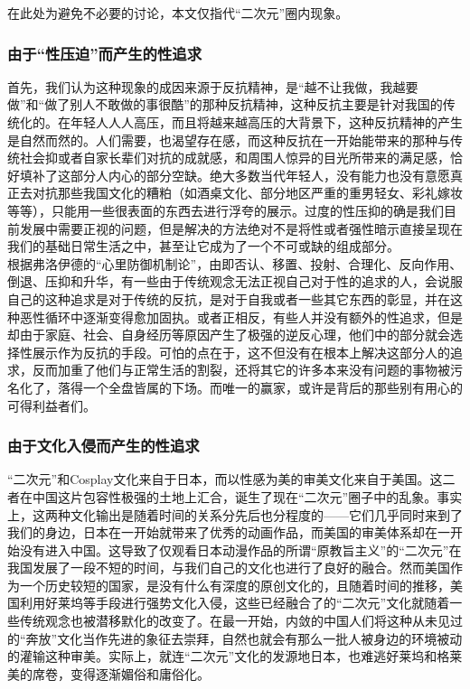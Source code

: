 \documentclass[a4paper]{article}
\begin{document}
	在此处为避免不必要的讨论，本文仅指代“二次元”圈内现象。
	
	\subsubsection{由于“性压迫”而产生的性追求}
	首先，我们认为这种现象的成因来源于反抗精神，是“越不让我做，我越要做”和“做了别人不敢做的事很酷”的那种反抗精神，这种反抗主要是针对我国的传统化的。在年轻人人人高压，而且将越来越高压的大背景下，这种反抗精神的产生是自然而然的。人们需要，也渴望存在感，而这种反抗在一开始能带来的那种与传统社会抑或者自家长辈们对抗的成就感，和周围人惊异的目光所带来的满足感，恰好填补了这部分人内心的部分空缺。绝大多数当代年轻人，没有能力也没有意愿真正去对抗那些我国文化的糟粕（如酒桌文化、部分地区严重的重男轻女、彩礼嫁妆等等），只能用一些很表面的东西去进行浮夸的展示。过度的性压抑的确是我们目前发展中需要正视的问题，但是解决的方法绝对不是将性或者强性暗示直接呈现在我们的基础日常生活之中，甚至让它成为了一个不可或缺的组成部分。\\
	
	根据弗洛伊德的“心里防御机制论”，由即否认、移置、投射、合理化、反向作用、倒退、压抑和升华，有一些由于传统观念无法正视自己对于性的追求的人，会说服自己的这种追求是对于传统的反抗，是对于自我或者一些其它东西的彰显，并在这种恶性循环中逐渐变得愈加固执。或者正相反，有些人并没有额外的性追求，但是却由于家庭、社会、自身经历等原因产生了极强的逆反心理，他们中的部分就会选择性展示作为反抗的手段。可怕的点在于，这不但没有在根本上解决这部分人的追求，反而加重了他们与正常生活的割裂，还将其它的许多本来没有问题的事物被污名化了，落得一个全盘皆属的下场。而唯一的赢家，或许是背后的那些别有用心的可得利益者们。
	
	\subsubsection{由于文化入侵而产生的性追求}
	“二次元”和Cosplay文化来自于日本，而以性感为美的审美文化来自于美国。这二者在中国这片包容性极强的土地上汇合，诞生了现在“二次元”圈子中的乱象。事实上，这两种文化输出是随着时间的关系分先后也分程度的——它们几乎同时来到了我们的身边，日本在一开始就带来了优秀的动画作品，而美国的审美体系却在一开始没有进入中国。这导致了仅观看日本动漫作品的所谓“原教旨主义”的“二次元”在我国发展了一段不短的时间，与我们自己的文化也进行了良好的融合。然而美国作为一个历史较短的国家，是没有什么有深度的原创文化的，且随着时间的推移，美国利用好莱坞等手段进行强势文化入侵，这些已经融合了的“二次元”文化就随着一些传统观念也被潜移默化的改变了。在最一开始，内敛的中国人们将这种从未见过的“奔放”文化当作先进的象征去崇拜，自然也就会有那么一批人被身边的环境被动的灌输这种审美。实际上，就连“二次元”文化的发源地日本，也难逃好莱坞和格莱美的席卷，变得逐渐媚俗和庸俗化。
	
\end{document}
